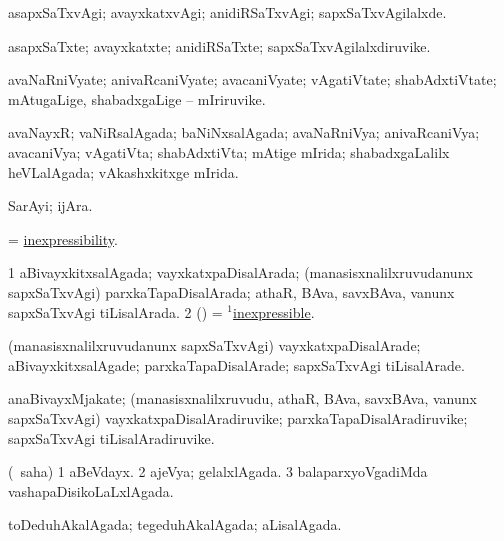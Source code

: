 \bentry
{}
\gl{\kirxvi}
\bmng
asapxSaTxvAgi; avayxkatxvAgi; anidiRSaTxvAgi; sapxSaTxvAgilalxde. 
\emng
\eentry

\bentry
{}
\gl{\nA}
\bmng
asapxSaTxte; avayxkatxte; anidiRSaTxte; sapxSaTxvAgilalxdiruvike. 
\emng
\eentry

\bentry
{}
\gl{\nA}
\bmng
avaNaRniVyate; anivaRcaniVyate; avacaniVyate; vAgatiVtate; shabAdxtiVtate; mAtugaLige, shabadxgaLige -- mIriruvike. 
\emng
\eentry

\bentry
{}
\gl{\gu}
\bmng
avaNayxR; vaNiRsalAgada; baNiNxsalAgada; avaNaRniVya; anivaRcaniVya; avacaniVya; vAgatiVta; shabAdxtiVta; mAtige mIrida; shabadxgaLalilx heVLalAgada; vAkashxkitxge mIrida. 
\emng
\eentry

\bentry
{}
\gl{\nA}
\bmng
SarAyi; ijAra. 
\emng
\eentry

\bentry
{}
\gl{\nA}
\bmng
 = \hyperlink{inexpressibility}{inexpressibility}. 
\emng
\eentry

\bentry
{}
\gl{\gu}
\bmng
\bnum
\num{1} aBivayxkitxsalAgada; vayxkatxpaDisalArada; (manasisxnalilxruvudanunx sapxSaTxvAgi) parxkaTapaDisalArada; athaR, BAva, savxBAva, \mo vanunx sapxSaTxvAgi tiLisalArada. 
\num{2} (\pArxparx)  = \hyperlink{inexpressible(1)}{$^1$inexpressible}. 
\enum
\emng
\eentry

\bentry
{}
\gl{\kirxvi}
\bmng
(manasisxnalilxruvudanunx sapxSaTxvAgi) vayxkatxpaDisalArade; aBivayxkitxsalAgade; parxkaTapaDisalArade; sapxSaTxvAgi tiLisalArade. 
\emng
\eentry

\bentry
{}
\gl{\nA}
\bmng
anaBivayxMjakate; (manasisxnalilxruvudu, athaR, BAva, savxBAva, \mo vanunx sapxSaTxvAgi) vayxkatxpaDisalAradiruvike; parxkaTapaDisalAradiruvike; sapxSaTxvAgi tiLisalAradiruvike. 
\emng
\eentry

\bentry
{}
\gl{\gu}
\bmng
(\rUpa\ saha) 
\bnum
\num{1} aBeVdayx. 
\num{2} ajeVya; gelalxlAgada. 
\num{3} balaparxyoVgadiMda vashapaDisikoLaLxlAgada. 
\enum
\emng
\eentry

\bentry
{}
\gl{\gu}
\bmng
toDeduhAkalAgada; tegeduhAkalAgada; aLisalAgada. 
\emng
\eentry

